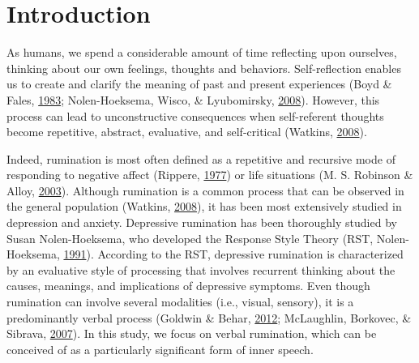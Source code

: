 \documentclass[a4paper,12pt,twoside,openright,oldfontcommands]{memoir}
\begin{document}
\section{Introduction}\label{introduction}

As humans, we spend a considerable amount of time reflecting upon
ourselves, thinking about our own feelings, thoughts and behaviors.
Self-reflection enables us to create and clarify the meaning of past and
present experiences (Boyd \& Fales,
\protect\hyperlink{ref-boyd_reflective_1983}{1983}; Nolen-Hoeksema,
Wisco, \& Lyubomirsky,
\protect\hyperlink{ref-Nolen-Hoeksema2008}{2008}). However, this process
can lead to unconstructive consequences when self-referent thoughts
become repetitive, abstract, evaluative, and self-critical (Watkins,
\protect\hyperlink{ref-Watkins2008}{2008}).

Indeed, rumination is most often defined as a repetitive and recursive
mode of responding to negative affect (Rippere,
\protect\hyperlink{ref-Rippere1977}{1977}) or life situations (M. S.
Robinson \& Alloy, \protect\hyperlink{ref-Robinson2003}{2003}). Although
rumination is a common process that can be observed in the general
population (Watkins, \protect\hyperlink{ref-Watkins2008}{2008}), it has
been most extensively studied in depression and anxiety. Depressive
rumination has been thoroughly studied by Susan Nolen-Hoeksema, who
developed the Response Style Theory (RST, Nolen-Hoeksema,
\protect\hyperlink{ref-nolen-hoeksema_responses_1991}{1991}). According
to the RST, depressive rumination is characterized by an evaluative
style of processing that involves recurrent thinking about the causes,
meanings, and implications of depressive symptoms. Even though
rumination can involve several modalities (i.e., visual, sensory), it is
a predominantly verbal process (Goldwin \& Behar,
\protect\hyperlink{ref-goldwin_concreteness_2012}{2012}; McLaughlin,
Borkovec, \& Sibrava,
\protect\hyperlink{ref-mclaughlin_effects_2007}{2007}). In this study,
we focus on verbal rumination, which can be conceived of as a
particularly significant form of inner speech.
\end{document}
